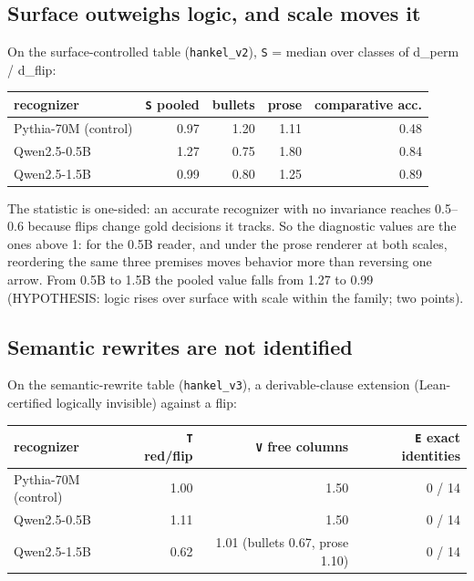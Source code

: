 \hypertarget{surface-outweighs-logic-and-scale-moves-it}{%
\subsection{Surface outweighs logic, and scale moves
it}\label{surface-outweighs-logic-and-scale-moves-it}}

On the surface-controlled table (\texttt{hankel\_v2}), \texttt{S} =
median over classes of d\_perm / d\_flip:

\begin{longtable}[]{@{}lrrrr@{}}
\toprule\noalign{}
recognizer & \texttt{S} pooled & bullets & prose & comparative acc. \\
\midrule\noalign{}
\endhead
\bottomrule\noalign{}
\endlastfoot
Pythia-70M (control) & 0.97 & 1.20 & 1.11 & 0.48 \\
Qwen2.5-0.5B & 1.27 & 0.75 & 1.80 & 0.84 \\
Qwen2.5-1.5B & 0.99 & 0.80 & 1.25 & 0.89 \\
\end{longtable}

The statistic is one-sided: an accurate recognizer with no invariance
reaches 0.5--0.6 because flips change gold decisions it tracks. So the
diagnostic values are the ones above 1: for the 0.5B reader, and under
the prose renderer at both scales, reordering the same three premises
moves behavior more than reversing one arrow. From 0.5B to 1.5B the
pooled value falls from 1.27 to 0.99 (HYPOTHESIS: logic rises over
surface with scale within the family; two points).

\hypertarget{semantic-rewrites-are-not-identified}{%
\subsection{Semantic rewrites are not
identified}\label{semantic-rewrites-are-not-identified}}

On the semantic-rewrite table (\texttt{hankel\_v3}), a derivable-clause
extension (Lean-certified logically invisible) against a flip:

\begin{longtable}[]{@{}lrrr@{}}
\toprule\noalign{}
recognizer & \texttt{T} red/flip & \texttt{V} free columns & \texttt{E}
exact identities \\
\midrule\noalign{}
\endhead
\bottomrule\noalign{}
\endlastfoot
Pythia-70M (control) & 1.00 & 1.50 & 0 / 14 \\
Qwen2.5-0.5B & 1.11 & 1.50 & 0 / 14 \\
Qwen2.5-1.5B & 0.62 & 1.01 (bullets 0.67, prose 1.10) & 0 / 14 \\
\end{longtable}

